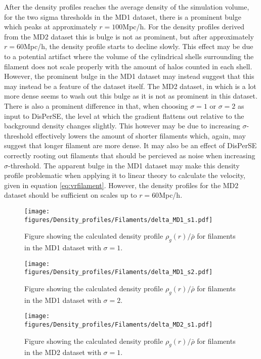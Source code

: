 After the density profiles reaches the average density of the simulation volume, for the two sigma thresholds in the MD1 dataset, there is a prominent bulge which peaks at approximately $r=100$Mpc/h. For the density profiles derived from the MD2 dataset this is bulge is not as prominent, but after approximately $r=60$Mpc/h, the density profile starts to decline slowly. This effect may be due to a potential artifact where the volume of the cylindrical shells surrounding the filament does not scale properly with the amount of halos counted in each shell. However, the prominent bulge in the MD1 dataset may instead suggest that this may instead be a feature of the dataset itself. The MD2 dataset, in which is a lot more dense seems to wash out this bulge as it is not as prominent in this dataset. There is also a prominent difference in that, when choosing $\sigma=1$ or $\sigma=2$ as input to DisPerSE, the level at which the gradient flattens out relative to the background density changes slightly. This however may be due to increasing $\sigma$-threshold effectively lowers the amount of shorter filaments which, again, may suggest that longer filament are more dense. It may also be an effect of DisPerSE correctly rooting out filaments that should be percieved as noise when increasing $\sigma$-threshold. The apparent bulge in the MD1 dataset may make this density profile problematic when applying it to linear theory to calculate the velocity, given in equation \ref{eq:vrfilament}. However, the density profiles for the MD2 dataset should be sufficient on scales up to $r=60$Mpc/h.
\begin{figure}[H]
    \texttt{[image: figures/Density\_profiles/Filaments/delta\_MD1\_s1.pdf]}
    \caption{Figure showing the calculated density profile $\rho_g(r)/\bar{\rho}$ for filaments in the MD1 dataset with $\sigma=1$.}
    \label{fig:fildensitytMD1s1}
\end{figure}

\begin{figure}[H]
    \texttt{[image: figures/Density\_profiles/Filaments/delta\_MD1\_s2.pdf]}
    \caption{Figure showing the calculated density profile $\rho_g(r)/\bar{\rho}$ for filaments in the MD1 dataset with $\sigma=2$.}
    \label{fig:fildensitytMD1s2}
\end{figure}

\begin{figure}[H]
    \texttt{[image: figures/Density\_profiles/Filaments/delta\_MD2\_s1.pdf]}
    \caption{Figure showing the calculated density profile $\rho_g(r)/\bar{\rho}$ for filaments in the MD2 dataset with $\sigma=1$.}
    \label{fig:fildensitytMD2s1}
\end{figure}

